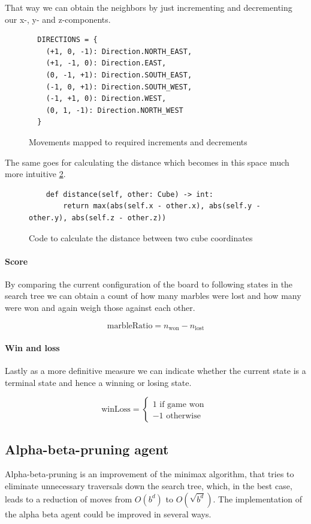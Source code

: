 \documentclass{llncs}
\begin{document}
That way we can obtain the neighbors by just incrementing and decrementing our x-, y- and z-components.

\begin{figure}
	\begin{lstlisting}
  DIRECTIONS = {
    (+1, 0, -1): Direction.NORTH_EAST,
    (+1, -1, 0): Direction.EAST,
    (0, -1, +1): Direction.SOUTH_EAST,
    (-1, 0, +1): Direction.SOUTH_WEST,
    (-1, +1, 0): Direction.WEST,
    (0, 1, -1): Direction.NORTH_WEST
  }
\end{lstlisting}
	\label{directions}
	\caption{Movements mapped to required increments and decrements}
\end{figure}

The same goes for calculating the distance which becomes in this space much more intuitive \ref{distance}.

\begin{figure}
	\begin{lstlisting}
    def distance(self, other: Cube) -> int:
        return max(abs(self.x - other.x), abs(self.y - other.y), abs(self.z - other.z))
\end{lstlisting}
	\label{distance}
	\caption{Code to calculate the distance between two cube coordinates \cite{noauthor_ture_nodate}}
\end{figure}

\paragraph{Score}
By comparing the current configuration of the board to following states in the search tree we can obtain a count of how many marbles were lost and how many were won and again weigh those against each other.

$$ \text{marbleRatio} = n_{\text{won}} - n_{\text{lost}} $$

\paragraph{Win and loss}
Lastly as a more definitive measure we can indicate whether the current state is a terminal state and hence a winning or losing state.

$$ \text{winLoss} =
	\begin{cases}
		1 \text{ if game won } \\
		-1 \text{ otherwise}
	\end{cases}
$$

\subsection{Alpha-beta-pruning agent}
Alpha-beta-pruning is an improvement of the minimax algorithm, that tries to eliminate unnecessary traversals down the search tree, which, in the best case, leads to a reduction of moves from $ O(b^d) $ to $ O(\sqrt{b^d}) $. The implementation of the alpha beta agent could be improved in several ways.
\end{document}
